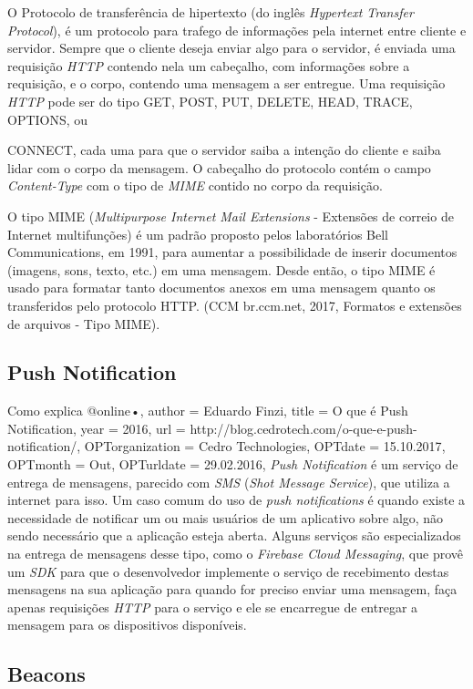 \documentclass[
	12pt,				%
	oneside,			%
	a4paper,			%
	brazil				%
]{abntex2}
\begin{document}
O Protocolo de transferência de hipertexto (do inglês \textit{Hypertext Transfer Protocol}), é um protocolo para trafego de informações pela internet entre cliente e servidor. Sempre que o cliente deseja enviar algo para o servidor, é enviada uma requisição \textit{HTTP} contendo nela um cabeçalho, com informações sobre a requisição, e o corpo, contendo uma mensagem a ser entregue. Uma requisição \textit{HTTP} pode ser do tipo GET, POST, PUT, DELETE, HEAD, TRACE, OPTIONS, ou {CONNECT, cada uma para que o servidor saiba a intenção do cliente e saiba lidar com o corpo da mensagem.
O cabeçalho do protocolo contém o campo \textit{Content-Type} com o tipo de \textit{MIME} contido no corpo da requisição. 

O tipo MIME (\textit{Multipurpose Internet Mail Extensions} - Extensões de correio de Internet multifunções) é um padrão proposto pelos laboratórios Bell Communications, em 1991, para aumentar a possibilidade de inserir documentos (imagens, sons, texto, etc.) em uma mensagem. Desde então, o tipo MIME é usado para formatar tanto documentos anexos em uma mensagem quanto os transferidos pelo protocolo HTTP. (CCM br.ccm.net, 2017, Formatos e extensões de arquivos - Tipo MIME).

\subsection{Push Notification}

Como explica @online{•,
author = {Eduardo Finzi},
title = {O que é Push Notification},
year = {2016},
url = {http://blog.cedrotech.com/o-que-e-push-notification/},
OPTorganization = {Cedro Technologies},
OPTdate = {15.10.2017},
OPTmonth = {Out},
OPTurldate = {29.02.2016},
}
 \textit{Push Notification} é um serviço de entrega de mensagens, parecido com \textit{SMS} (\textit{Shot Message Service}), que utiliza a internet para isso. Um caso comum do uso de \textit{push notifications} é quando existe a necessidade de notificar um ou mais usuários de um aplicativo sobre algo, não sendo necessário que a aplicação esteja aberta. Alguns serviços são especializados na entrega de mensagens desse tipo, como o \textit{Firebase Cloud Messaging}, que provê um \textit{SDK} para que o desenvolvedor implemente o serviço de recebimento destas mensagens na sua aplicação para quando for preciso enviar uma mensagem, faça apenas requisições \textit{HTTP} para o serviço e ele se encarregue de entregar a mensagem para os dispositivos disponíveis.

\subsection{Beacons}

}
\end{document}
